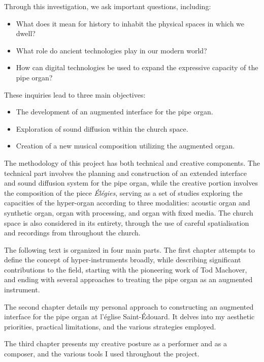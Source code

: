 \documentclass[12pt,twoside,maitrise]{dms_ks}
\theoremstyle{definition}
\begin{document}
Through this investigation, we ask important questions, including:
\begin{itemize}
    \item What does it mean for history to inhabit the physical spaces in which we dwell?
    \item What role do ancient technologies play in our modern world?
    \item How can digital technologies be used to expand the expressive capacity of the pipe organ?
\end{itemize}

These inquiries lead to three main objectives:
\begin{itemize}
    \item The development of an augmented interface for the pipe organ.
    \item Exploration of sound diffusion within the church space.
    \item Creation of a new musical composition utilizing the augmented organ.
\end{itemize}

The methodology of this project has both technical and creative components. 
The technical part involves the planning and construction of an extended interface and sound diffusion system for the pipe organ, while the creative portion involves the composition of the piece \textit{Élégies}, serving as a set of studies exploring the capacities of the hyper-organ according to three modalities: acoustic organ and synthetic organ, organ with processing, and organ with fixed media. 
The church space is also considered in its entirety, through the use of careful spatialisation and recordings from throughout the church.									

The following text is organized in four main parts. 
The first chapter attempts to define the concept of hyper-instruments broadly, while describing significant contributions to the field, starting with the pioneering work of Tod Machover, and ending with several approaches to treating the pipe organ as an augmented instrument.

The second chapter details my personal approach to constructing an augmented interface for the pipe organ at l’église Saint-Édouard. 
It delves into my aesthetic priorities, practical limitations, and the various strategies employed. 

The third chapter presents my creative posture as a performer and as a composer, and the various tools I used throughout the project. 
\end{document}
